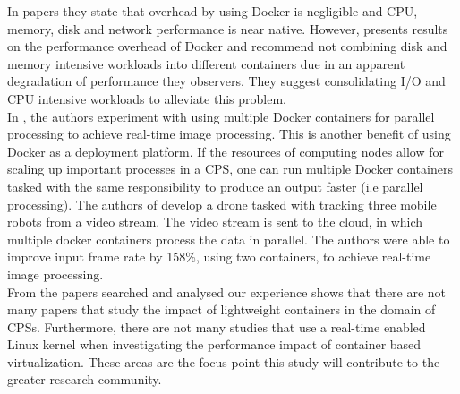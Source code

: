 In papers \cite{p6,p10,p3,p4,p7,p9} they state that overhead by using Docker is negligible and CPU, memory, disk and network performance is near native. However, \cite{p5} presents results on the performance overhead of Docker and recommend not combining disk and memory intensive workloads into different containers due in an apparent degradation of performance they observers. They suggest consolidating I/O and CPU intensive workloads to alleviate this problem. \\

In \cite{p8}, the authors experiment with using multiple Docker containers for parallel processing to achieve real-time image processing. This is another benefit of using Docker as a deployment platform. If the resources of computing nodes allow for scaling up important processes in a CPS, one can run multiple Docker containers tasked with the same responsibility to produce an output faster (i.e parallel processing). The authors of \cite{p8} develop a drone tasked with tracking three mobile robots from a video stream. The video stream is sent to the cloud, in which multiple docker containers process the data in parallel. The authors were able to improve input frame rate by 158\%, using two containers, to achieve real-time image processing. \\

From the papers searched and analysed our experience shows that there are not many papers that study the impact of lightweight containers in the domain of CPSs. Furthermore, there are not many studies that use a real-time enabled Linux kernel when investigating the performance impact of container based virtualization. These areas are the focus point this study will contribute to the greater research community. 

